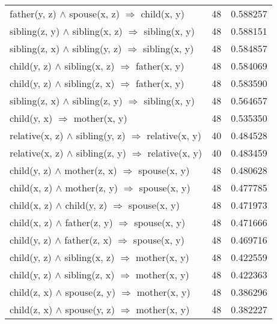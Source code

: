 \begin{longtable}{lrr}
       father(y, z) $\wedge$ spouse(x, z)   $\Rightarrow$ child(x, y) &           48 &        0.588257 \\
   sibling(z, y) $\wedge$ sibling(x, z)   $\Rightarrow$ sibling(x, y) &           48 &        0.588151 \\
   sibling(z, x) $\wedge$ sibling(y, z)   $\Rightarrow$ sibling(x, y) &           48 &        0.584857 \\
      child(y, z) $\wedge$ sibling(x, z)   $\Rightarrow$ father(x, y) &           48 &        0.584069 \\
      child(y, z) $\wedge$ sibling(z, x)   $\Rightarrow$ father(x, y) &           48 &        0.583590 \\
   sibling(z, x) $\wedge$ sibling(z, y)   $\Rightarrow$ sibling(x, y) &           48 &        0.564657 \\
                       child(y, x)   $\Rightarrow$ mother(x, y) &           48 &        0.535350 \\
 relative(x, z) $\wedge$ sibling(y, z)   $\Rightarrow$ relative(x, y) &           40 &        0.484528 \\
 relative(x, z) $\wedge$ sibling(z, y)   $\Rightarrow$ relative(x, y) &           40 &        0.483459 \\
       child(y, z) $\wedge$ mother(z, x)   $\Rightarrow$ spouse(x, y) &           48 &        0.480628 \\
       child(x, z) $\wedge$ mother(z, y)   $\Rightarrow$ spouse(x, y) &           48 &        0.477785 \\
        child(x, z) $\wedge$ child(y, z)   $\Rightarrow$ spouse(x, y) &           48 &        0.471973 \\
       child(x, z) $\wedge$ father(z, y)   $\Rightarrow$ spouse(x, y) &           48 &        0.471666 \\
       child(y, z) $\wedge$ father(z, x)   $\Rightarrow$ spouse(x, y) &           48 &        0.469716 \\
      child(y, z) $\wedge$ sibling(x, z)   $\Rightarrow$ mother(x, y) &           48 &        0.422559 \\
      child(y, z) $\wedge$ sibling(z, x)   $\Rightarrow$ mother(x, y) &           48 &        0.422363 \\
       child(z, x) $\wedge$ spouse(z, y)   $\Rightarrow$ mother(x, y) &           48 &        0.386296 \\
       child(z, x) $\wedge$ spouse(y, z)   $\Rightarrow$ mother(x, y) &           48 &        0.382227 \\

\end{longtable}
